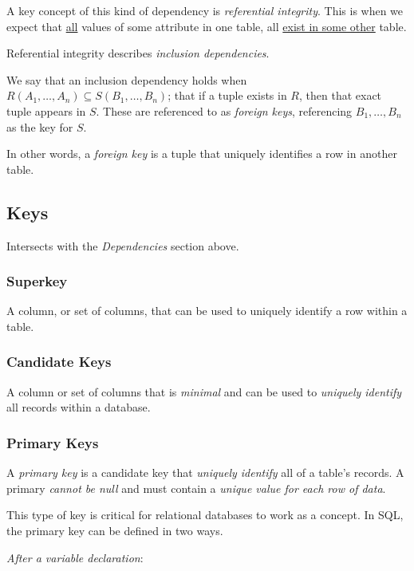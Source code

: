 \documentclass{article}
\begin{document}
A key concept of this kind of dependency is \textit{referential integrity}. This is when we expect that \underline{all} values of some attribute in one table, all \underline{exist in some other} table.

Referential integrity describes \textit{inclusion dependencies}.

We say that an inclusion dependency holds when $R(A_1, \ldots, A_n) \subseteq S(B_1, \ldots, B_n)$; that if a tuple exists in $R$, then that exact tuple appears in $S$. These are referenced to as \textit{foreign keys}, referencing $B_1, \ldots, B_n$ as the key for $S$.

In other words, a \textit{foreign key} is a tuple that uniquely identifies a row in another table.

\filbreak
\subsection{Keys}

Intersects with the \textit{Dependencies} section above.

\subsubsection{Superkey}

A column, or set of columns, that can be used to uniquely identify a row within a table.

\subsubsection{Candidate Keys}

A column or set of columns that is \textit{minimal} and can be used to \textit{uniquely identify} all records within a database.

\subsubsection{Primary Keys}

A \textit{primary key} is a candidate key that \textit{uniquely identify} all of a table's records. A primary \textit{cannot be null} and must contain a \textit{unique value for each row of data}.

This type of key is critical for relational databases to work as a concept. In SQL, the primary key can be defined in two ways.

\textit{After a variable declaration}:
\end{document}
